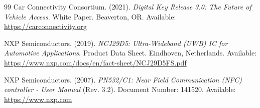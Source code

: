 \begin{thebibliography}{99}
Car Connectivity Consortium. (2021). \textit{Digital Key Release 3.0: The Future of Vehicle Access}. White Paper. Beaverton, OR. Available: \url{https://carconnectivity.org}

NXP Semiconductors. (2019). \textit{NCJ29D5: Ultra-Wideband (UWB) IC for Automotive Applications}. Product Data Sheet. Eindhoven, Netherlands. Available: \url{https://www.nxp.com/docs/en/fact-sheet/NCJ29D5FS.pdf}

NXP Semiconductors. (2007). \textit{PN532/C1: Near Field Communication (NFC) controller - User Manual} (Rev. 3.2). Document Number: 141520. Available: \url{https://www.nxp.com}
\end{thebibliography}

